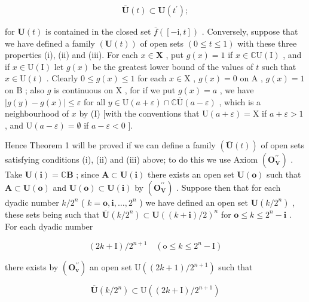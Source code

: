 \[
\overline {{{\mathbf {U}}}} (t) \subset \mathbf {U} (t ^ {\prime});\tag{1}
\]

for \(\mathbf{U}(t)\) is contained in the closed set \(\overline{f}([-\mathrm{i}, t])\) . Conversely, suppose that we have defined a family \((\mathbf{U}(t))\) of open sets \((0 \leqslant t \leqslant 1)\) with these three properties (i), (ii) and (iii). For each \(x \in \mathbf{X}\) , put \(g(x) = 1\) if \(x \in \mathbb{C}\mathrm{U}(\mathrm{I})\) , and if \(x \in \mathrm{U}(\mathrm{I})\) let \(g(x)\) be the greatest lower bound of the values of \(t\) such that \(x \in \mathrm{U}(t)\) . Clearly \(0 \leqslant g(x) \leqslant 1\) for each \(x \in \mathrm{X}\) , \(g(x) = 0\) on \(\mathrm{A}\) , \(g(x) = 1\) on \(\mathrm{B}\) ; also \(g\) is continuous on \(\mathrm{X}\) , for if we put \(g(x) = a\) , we have \(|g(y) - g(x)| \leqslant \varepsilon\) for all \(y \in \mathrm{U}(a + \varepsilon) \cap \mathbb{C}\overline{\mathrm{U}}(a - \varepsilon)\) , which is a neighbourhood of \(x\) by (I) {[}with the conventions that \(\mathrm{U}(a + \varepsilon) = \mathrm{X}\) if \(a + \varepsilon > 1\) , and \(\mathrm{U}(a - \varepsilon) = \emptyset\) if \(a - \varepsilon < 0\) {]}.

Hence Theorem 1 will be proved if we can define a family \((\overline{\mathbf{U}}(t))\) of open sets satisfying conditions (i), (ii) and (iii) above; to do this we use Axiom \((\mathbf{O}_{\mathbf{V}}^{\prime \prime})\) . Take \(\mathbf{U}(\mathbf{i}) = \mathbb{C}\mathbf{B}\) ; since \(\mathbf{A} \subset \mathbf{U}(\mathbf{i})\) there exists an open set \(\mathbf{U}(\mathbf{o})\) such that \(\mathbf{A} \subset \mathbf{U}(\mathbf{o})\) and \(\mathbf{U}(\mathbf{o}) \subset \mathbf{U}(\mathbf{i})\) by \((\mathbf{O}_{\mathbf{V}}^{\prime \prime})\) . Suppose then that for each dyadic number \(k / 2^n\) ( \(k = \mathbf{o}, \mathbf{i}, \ldots, 2^n\) ) we have defined an open set \(\mathbf{U}(k / 2^n)\) , these sets being such that \(\overline{\mathbf{U}}(k / 2^n) \subset \mathbf{U}((k + \mathbf{i}) / 2)^n\) for \(\mathbf{o} \leqslant k \leqslant 2^n - \mathbf{i}\) . For each dyadic number

\[
(2 k + \mathrm{I}) / 2 ^ {n + 1} \quad (\mathrm{o} \leqslant k \leqslant 2 ^ {n} - \mathrm{I})
\]

there exists by \((\mathbf{O}_{\mathbf{v}}^{\prime \prime})\) an open set \(\mathrm{U}((2k + 1) / 2^{n + 1})\) such that

\[
\overline {{{{\mathbf {U}}}}} (k / 2 ^ {n}) \subset \mathrm{U} ((2 k + \mathrm{I}) / 2 ^ {n + 1})
\]

